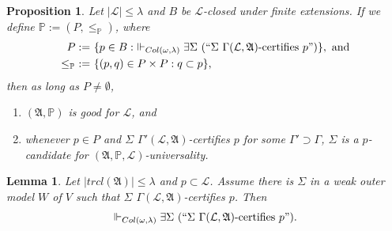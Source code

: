 \documentclass[12pt, twoside]{memoir}
\numberwithin{equation}{section}
\newtheorem{lem}[thm]{Lemma}
\newtheorem{prop}[thm]{Proposition}
\theoremstyle{definition}
\theoremstyle{remark}
\theoremstyle{definition}
\theoremstyle{definition}
\theoremstyle{definition}
\theoremstyle{remark}
\begin{document}
\begin{prop}\label{certgood}
Let $|\mathcal{L}| \leq \lambda$ and $B$ be $\mathcal{L}$-closed under finite extensions. If we define $\mathbb{P} := (P, \leq_{\mathbb{P}})$, where
\begin{align*}
    P := \ & \{p \in B : \ \Vdash_{Col(\omega, \lambda)} \exists \Sigma \ (``\Sigma \ \Gamma(\mathcal{L}, \mathfrak{A}) \text{-certifies } p")\}, \text{ and} \\
    \leq_{\mathbb{P}} \ := \ & \{(p, q) \in P \times P : q \subset p\},
\end{align*}
then as long as $P \neq \emptyset$, 
\begin{enumerate}[label=(\alph*)]
    \item $(\mathfrak{A}, \mathbb{P})$ is good for $\mathcal{L}$, and
    \item whenever $p \in P$ and $\Sigma$ $\Gamma'(\mathcal{L}, \mathfrak{A})$-certifies $p$ for some $\Gamma' \supset \Gamma$, $\Sigma$ is a $p$-candidate for $(\mathfrak{A}, \mathbb{P}, \mathcal{L})$-universality.
\end{enumerate}
\end{prop}

\begin{lem}\label{inout}
Let $|trcl(\mathfrak{A})| \leq \lambda$ and $p \subset \mathcal{L}$. Assume there is $\Sigma$ in a weak outer model $W$ of $V$ such that $\Sigma$ $\Gamma(\mathcal{L}, \mathfrak{A})$-certifies $p$. Then $$\Vdash_{Col(\omega, \lambda)} \exists \Sigma \ (``\Sigma \ \Gamma(\mathcal{L}, \mathfrak{A}) \text{-certifies } p").$$
\end{lem}
\end{document}
